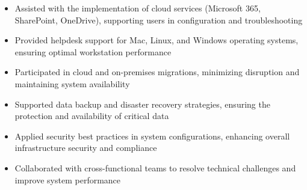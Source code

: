 \par\smallskip
\noindent
\begin{minipage}{20cm}
  \begin{minipage}{9.75cm}
    \begin{itemize}
      \item Assisted with the implementation of cloud services (Microsoft 365, SharePoint, OneDrive), supporting users in configuration and troubleshooting
      \item Provided helpdesk support for Mac, Linux, and Windows operating systems, ensuring optimal workstation performance
      \item Participated in cloud and on-premises migrations, minimizing disruption and maintaining system availability
    \end{itemize}
  \end{minipage}
  \hfill
  \begin{minipage}{9.75cm}
    \begin{itemize}
      \item Supported data backup and disaster recovery strategies, ensuring the protection and availability of critical data
      \item Applied security best practices in system configurations, enhancing overall infrastructure security and compliance
      \item Collaborated with cross-functional teams to resolve technical challenges and improve system performance
    \end{itemize}
  \end{minipage}
\end{minipage}
\par\smallskip
\divider

